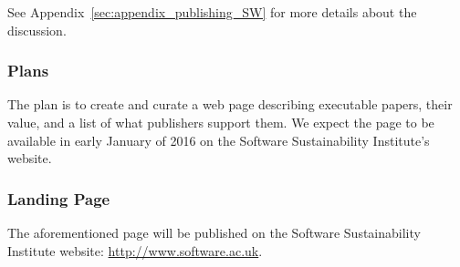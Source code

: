 See Appendix~\ref{sec:appendix_publishing_SW} for more details about the
discussion.

\subsubsection{Plans}

The plan is to create and curate a web page describing executable papers, their value, and
a list of what publishers support them. We expect the page to be available in
early January of 2016 on the Software Sustainability Institute's website.

\subsubsection{Landing Page}

The aforementioned page will be published on the Software Sustainability
Institute website: \url{http://www.software.ac.uk}.
